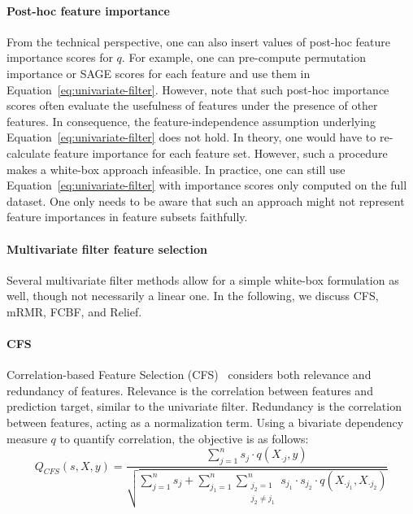 \documentclass{article}
\theoremstyle{definition}
\begin{document}
\paragraph{Post-hoc feature importance}

From the technical perspective, one can also insert values of post-hoc feature importance scores for $q$.
For example, one can pre-compute permutation importance or SAGE scores for each feature and use them in Equation~\ref{eq:univariate-filter}.
However, note that such post-hoc importance scores often evaluate the usefulness of features under the presence of other features.
In consequence, the feature-independence assumption underlying Equation~\ref{eq:univariate-filter} does not hold.
In theory, one would have to re-calculate feature importance for each feature set.
However, such a procedure makes a white-box approach infeasible.
In practice, one can still use Equation~\ref{eq:univariate-filter} with importance scores only computed on the full dataset.
One only needs to be aware that such an approach might not represent feature importances in feature subsets faithfully.

\paragraph{Multivariate filter feature selection}

Several multivariate filter methods allow for a simple white-box formulation as well, though not necessarily a linear one.
In the following, we discuss CFS, mRMR, FCBF, and Relief.

\paragraph{CFS}

Correlation-based Feature Selection (CFS)~\cite{hall1999correlation} considers both relevance and redundancy of features.
Relevance is the correlation between features and prediction target, similar to the univariate filter.
Redundancy is the correlation between features, acting as a normalization term.
Using a bivariate dependency measure $q$ to quantify correlation, the objective is as follows:
%
\begin{equation}
	Q_{CFS}(s,X,y) = \frac{\sum_{j=1}^{n} s_j \cdot q(X_{\cdot{}j},y)}{\sqrt{\sum_{j=1}^{n} s_j + \sum_{j_1=1}^{n} \sum_{\substack{j_2=1 \\ j_2 \neq j_1}}^{n} s_{j_1} \cdot s_{j_2} \cdot q(X_{\cdot{}j_1}, X_{\cdot{}j_2})}}
	\label{eq:cfs}
\end{equation}
%
\end{document}
